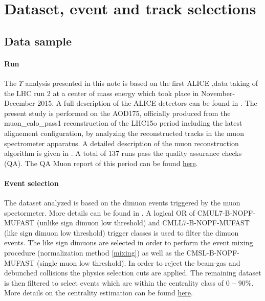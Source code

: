 \graphicspath{{Figures/Dataset_Selection_Cuts/}}


\section{\label{Data}Dataset, event and track selections}


\subsection{\label{Data}Data sample}

\paragraph{Run}
The $\Upsilon$ analysis presented in this note is based on the first ALICE \PbPb\sep data taking of the LHC run 2 at a center of mass energy  which took place in November-December 2015.
A full description of the ALICE detectors can be found in \cite{ALICEexpe}.
The present study is performed on the AOD175, officially produced from the muon\_calo\_pass1 reconstruction of the LHC15o period including the latest alignement configuration, by analyzing the reconstructed tracks in the muon spectrometer apparatus.
A detailed description of the muon reconstruction algorithm is given in \cite{simuSpectro, LongJpsiPaper}.
A total of 137 runs pass the quality assurance checks (QA). 
The {QA Muon} report of this period can be found \href{https://twiki.cern.ch/twiki/bin/view/ALICE/MuonPbPbQA2015}{here}.


\paragraph{\label{Event}Event selection}
The dataset analyzed is based on the dimuon events triggered by the muon spectormeter. 
More details can be found in \cite{LongJpsiPaper,UpsilonPbPb276ALICE}.
A logical OR of {CMUL7-B-NOPF-MUFAST} (unlike sign dimuon low \pt threshold) and {CMLL7-B-NOPF-MUFAST} (like sign dimuon low \pt threshold) trigger classes is used to filter the dimuon events.
The like sign dimuons are selected in order to perform the event mixing procedure (normalization method \ref{mixing}) as well as the {CMSL-B-NOPF-MUFAST} (single muon low \pt threshold).
In order to reject the beam-gas and debunched collisions the physics selection cuts are applied. 
The remaining dataset is then filtered to select events which are within the centrality class of $0-90\%$.
More details on the centrality estimation can be found \href{https://twiki.cern.ch/twiki/bin/view/ALICE/CentralityCodeSnippets#Anchor_Point}{here}.


